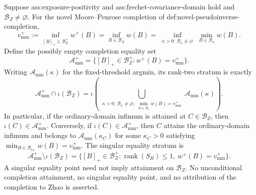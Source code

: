 Suppose ass:exposure-positivity and ass:frechet-covariance-domain hold and \(\mathcal B_Z\ne\varnothing\).  For the novel Moore--Penrose completion of def:novel-pseudoinverse-completion,
\[
v_{\mathrm{mm}}^+
:=\inf_{[B]_+\in\mathcal B_Z^+}w^+(B)
=\inf_{B\in\mathcal B_Z}w(B)
=\inf_{\substack{\kappa>0:\,\mathcal B_\kappa\ne\varnothing}}
\min_{B\in\mathcal B_\kappa}w(B).
\]
Define the possibly empty completion equality set
\[
\mathcal A_{\mathrm{mm}}^+
=\{[B]_+\in\mathcal B_Z^+:w^+(B)=v_{\mathrm{mm}}^+\}.
\]
Writing \(\mathcal A_{\mathrm{mm}}(\kappa)\) for the fixed-threshold argmin, its rank-two stratum is exactly
\[
\mathcal A_{\mathrm{mm}}^+\cap\iota(\mathcal B_Z)
=\iota\!\left(
\bigcup_{\substack{\kappa>0:\,
\mathcal B_\kappa\ne\varnothing,\ 
\min_{B\in\mathcal B_\kappa}w(B)=v_{\mathrm{mm}}^+}}
\mathcal A_{\mathrm{mm}}(\kappa)\right).
\]
In particular, if the ordinary-domain infimum is attained at \(C\in\mathcal B_Z\), then \(\iota(C)\in\mathcal A_{\mathrm{mm}}^+\).  Conversely, if \(\iota(C)\in\mathcal A_{\mathrm{mm}}^+\), then \(C\) attains the ordinary-domain infimum and belongs to \(\mathcal A_{\mathrm{mm}}(\kappa_C)\) for some \(\kappa_C>0\) satisfying \(\min_{B\in\mathcal B_{\kappa_C}}w(B)=v_{\mathrm{mm}}^+\).  The singular equality stratum is
\[
\mathcal A_{\mathrm{mm}}^+\setminus\iota(\mathcal B_Z)
=\{[B]_+\in\mathcal B_Z^+:\operatorname{rank}(S_B)\le1,\ w^+(B)=v_{\mathrm{mm}}^+\}.
\]
A singular equality point need not imply attainment on \(\mathcal B_Z\).  No unconditional completion attainment, no singular equality point, and no attribution of the completion to Zhao is asserted.